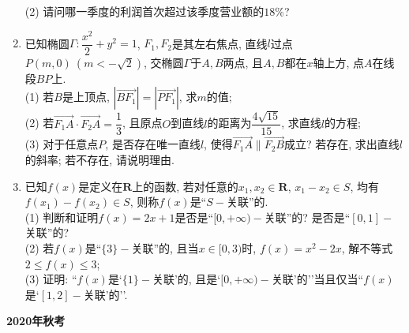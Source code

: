\documentclass[10pt,a4paper]{article}
\begin{document}
\begin{enumerate}[1.]
(2) 请问哪一季度的利润首次超过该季度营业额的$18\%$?
\item 已知椭圆$\Gamma:\dfrac{x^2}2+y^2=1$, $F_1, F_2$是其左右焦点, 直线$l$过点$P(m,0) \ (m<-\sqrt2)$, 交椭圆$\Gamma$于$A,B$两点, 且$A,B$都在$x$轴上方, 点$A$在线段$BP$上.\\
(1) 若$B$是上顶点, $|\overrightarrow{BF_1}|=|\overrightarrow{PF_1}|$, 求$m$的值;\\
(2) 若$\overrightarrow{F_1A}\cdot \overrightarrow{F_2A}=\dfrac13$, 且原点$O$到直线$l$的距离为$\dfrac{4\sqrt{15}}{15}$, 求直线$l$的方程;\\
(3) 对于任意点$P$, 是否存在唯一直线$l$, 使得$\overrightarrow{F_1A}\parallel \overrightarrow{F_2B}$成立? 若存在, 求出直线$l$的斜率; 若不存在, 请说明理由.
\item 已知$f(x)$是定义在$\mathbf{R}$上的函数, 若对任意的$x_1,x_2\in \mathbf{R}$, $x_1-x_2\in S$, 均有$f(x_1)-f(x_2)\in S$, 则称$f(x)$是``$S-$关联''的.\\
(1) 判断和证明$f(x)=2x+1$是否是``$[0,+\infty)-$关联''的? 是否是``$[0,1]-$关联''的?\\
(2) 若$f(x)$是``$\{3\}-$关联''的, 且当$x\in [0,3)$时, $f(x)=x^2-2x$, 解不等式$2 \le f(x)\le 3$;\\
(3) 证明: ``$f(x)$是`$\{1\}-$关联'的, 且是`$[0,+\infty)-$关联'的''当且仅当``$f(x)$是`$[1,2]-$关联'的''.







\end{enumerate}

\newpage

{\bf 2020年秋考}
\end{document}
